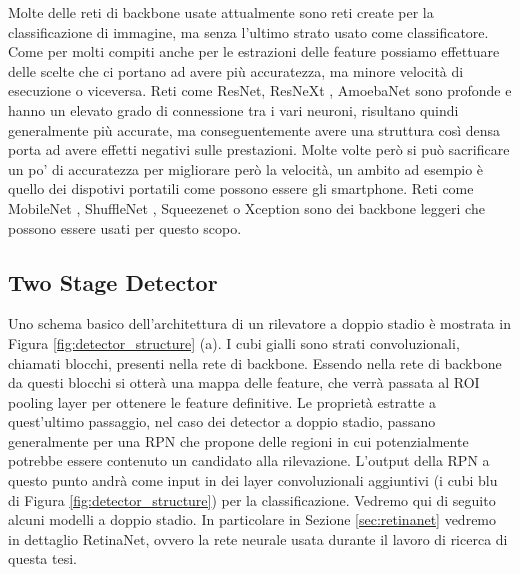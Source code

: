 Molte delle reti di backbone usate attualmente sono reti create per la classificazione di immagine, ma senza l'ultimo strato usato come classificatore. Come per molti compiti anche per le estrazioni delle feature possiamo effettuare delle scelte che ci portano ad avere più accuratezza, ma minore velocità di esecuzione o viceversa. 
Reti come ResNet\cite{viola2004robust}, ResNeXt \cite{he2015spatial}, AmoebaNet \cite{girshick2015fast} sono profonde e hanno un elevato grado di connessione tra i vari neuroni, risultano quindi generalmente più accurate, ma conseguentemente avere una struttura così densa porta ad avere effetti negativi sulle prestazioni. 
Molte volte però si può sacrificare un po' di accuratezza per migliorare però la velocità, un ambito ad esempio è quello dei dispotivi portatili come possono essere gli smartphone. Reti come MobileNet \cite{ren2015faster}, ShuffleNet \cite{redmon2016you}, Squeezenet \cite{liu2016ssd} o Xception \cite{lin2017feature} sono dei backbone leggeri che possono essere usati per questo scopo. 

\subsection{Two Stage Detector}
\label{subsec:two_stage_detector}
Uno schema basico dell'architettura di un rilevatore a doppio stadio è mostrata in Figura \ref{fig:detector_structure} (a). I cubi gialli sono strati convoluzionali, chiamati blocchi, presenti nella rete di backbone. Essendo nella rete di backbone da questi blocchi si otterà una mappa delle feature, che verrà passata al \ac{ROI} pooling layer per ottenere le feature definitive. 
Le proprietà estratte a quest'ultimo passaggio, nel caso dei detector a doppio stadio, passano generalmente per una \ac{RPN} che propone delle regioni in cui potenzialmente potrebbe essere contenuto un candidato alla rilevazione. L'output della \ac{RPN} a questo punto andrà come input in dei layer convoluzionali aggiuntivi (i cubi blu di Figura \ref{fig:detector_structure}) per la classificazione.
Vedremo qui di seguito alcuni modelli a doppio stadio. In particolare in Sezione \ref{sec:retinanet} vedremo in dettaglio RetinaNet, ovvero la rete neurale usata durante il lavoro di ricerca di questa tesi.  
